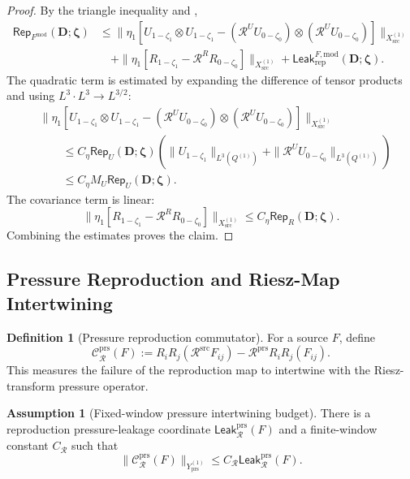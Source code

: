 \documentclass[11pt]{article}
\numberwithin{equation}{section}
\theoremstyle{definition}
\newtheorem{definition}[definition]{Definition}
\newtheorem{assumption}[assumption]{Assumption}
\theoremstyle{remark}
\newcommand{\prs}{\mathrm{prs}}
\newcommand{\src}{\mathrm{src}}
\newcommand{\rep}{\mathrm{rep}}
\newcommand{\Leak}{\mathsf{Leak}}
\newcommand{\Rep}{\mathsf{Rep}}
\newcommand{\calC}{\mathcal C}
\newcommand{\calR}{\mathcal R}
\newcommand{\bD}{\mathbf D}
\newcommand{\bzeta}{\boldsymbol\zeta}
\newcommand{\Xsrc}{X_{\src}}
\newcommand{\Yprs}{Y_{\prs}}
\begin{document}
\begin{proof}
By the triangle inequality and ,
\[
\begin{aligned}
    \Rep_{F^{\mathrm{mod}}}(\bD;\bzeta)
    &\le
    \|\eta_1[
        U_{1-\zeta_1}\otimes U_{1-\zeta_1}
        -
        (\calR^U U_{0-\zeta_0})\otimes(\calR^U U_{0-\zeta_0})
    ]\|_{\Xsrc^{(1)}}\\
    &\quad+
    \|\eta_1[
        R_{1-\zeta_1}
        -
        \calR^R R_{0-\zeta_0}
    ]\|_{\Xsrc^{(1)}}
    +
    \Leak_{\rep}^{F,\mathrm{mod}}(\bD;\bzeta).
\end{aligned}
\]
The quadratic term is estimated by expanding the difference of tensor products
and using \(L^3\cdot L^3\to L^{3/2}\):
\[
\begin{aligned}
    &\|\eta_1[
        U_{1-\zeta_1}\otimes U_{1-\zeta_1}
        -
        (\calR^U U_{0-\zeta_0})\otimes(\calR^U U_{0-\zeta_0})
    ]\|_{\Xsrc^{(1)}}\\
    &\qquad\le
    C_\eta
    \Rep_U(\bD;\bzeta)
    \left(
        \|U_{1-\zeta_1}\|_{L^3(Q^{(1)})}
        +
        \|\calR^U U_{0-\zeta_0}\|_{L^3(Q^{(1)})}
    \right)\\
    &\qquad\le
    C_\eta M_U\Rep_U(\bD;\bzeta).
\end{aligned}
\]
The covariance term is linear:
\[
    \|\eta_1[
        R_{1-\zeta_1}
        -
        \calR^R R_{0-\zeta_0}
    ]\|_{\Xsrc^{(1)}}
    \le
    C_\eta\Rep_R(\bD;\bzeta).
\]
Combining the estimates proves the claim.
\end{proof}

\subsection{Pressure Reproduction and Riesz-Map Intertwining}
\label{rep:sec:pressure-reproduction}

\begin{definition}[Pressure reproduction commutator]
\label{rep:def:pressure-reproduction-commutator}
For a source \(F\), define
\[
    \calC_{\calR}^{\prs}(F)
    :=
    R_iR_j(\calR^{\src}F_{ij})
    -
    \calR^{\prs}R_iR_j(F_{ij}).
\]
This measures the failure of the reproduction map to intertwine with the
Riesz-transform pressure operator.
\end{definition}

\begin{assumption}[Fixed-window pressure intertwining budget]
\label{rep:ass:pressure-intertwining-budget}
There is a reproduction pressure-leakage coordinate
\(\Leak_{\calR}^{\prs}(F)\) and a finite-window constant \(C_{\calR}\) such
that
\[
    \|\calC_{\calR}^{\prs}(F)\|_{\Yprs^{(1)}}
    \le
    C_{\calR}\Leak_{\calR}^{\prs}(F).
\]
\end{assumption}
\end{document}
